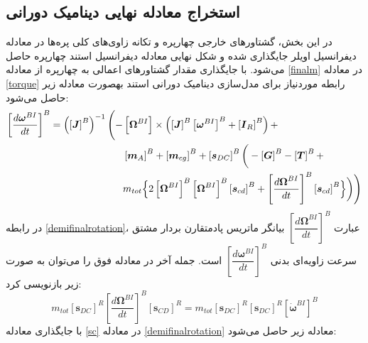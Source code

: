 \subsection{ استخراج معادله نهایی دينامیک دورانی}
در این بخش، گشتاورهای خارجی چهارپره و تكانه زاوی‌های کلی پره‌ها در معادله دیفرانسیل اویلر 
جایگذاری شده و شكل نهایی معادله دیفرانسیل استند چهارپره حاصل می‌شود. با جایگذاری مقدار 
گشتاورهای اعمالی به چهارپره از معادله
\ref{finalm}
در معادله 
\ref{torque}
رابطه موردنیاز برای مدل‌سازی
دینامیک دورانی استند بهصورت معادله زیر حاصل می‌شود:
\begin{equation}\label{demifinalrotation}
	\begin{split}
		\left[\dfrac{d\boldsymbol\omega^{BI}}{dt}\right]^B = 
		\left(\left[\boldsymbol J\right]^B\right)^{-1}\Bigg(
		-&\left[\boldsymbol\Omega^{BI}\right]\times\left(
		\left[\boldsymbol J\right]^B\left[\boldsymbol\omega^{BI}\right]^B
		+\left[\boldsymbol I_R\right]^B\right) + \\
		&\left[\boldsymbol m_A\right]^B + \left[\boldsymbol m_{cg}\right]^B +\left[\boldsymbol s_{DC}\right]^B
		\bigg(-\left[\boldsymbol G\right]^B
		-\left[\boldsymbol T\right]^B+ \\
		&m_{tot}\Bigl\{2
		\left[\boldsymbol \Omega^{BI}\right]^B
		\left[\boldsymbol \Omega^{BI}\right]^B
		\left[\boldsymbol s_{cd}\right]^B+
		\left[\dfrac{d\boldsymbol\Omega^{BI}}{dt}\right]^B
		\left[\boldsymbol s_{cd}\right]^B
		\Bigr\}\bigg)\Bigg)
	\end{split}
\end{equation}
در رابطه
\ref{demifinalrotation}،
عبارت
$\left[\dfrac{d\boldsymbol\Omega^{BI}}{dt}\right]^B$
بیانگر ماتریس پادمتقارن بردار مشتق سرعت‌ زاویه‌ای بدنی
$\left[\dfrac{d\boldsymbol\omega^{BI}}{dt}\right]^B$
است. جمله آخر در معادله فوق را می‌توان به صورت زیر بازنویسی کرد:
\begin{equation}\label{sc}
	m_{tot}\left[\boldsymbol s_{DC}\right]^R
	\left[\dfrac{d\boldsymbol\Omega^{BI}}{dt}\right]^B\left[\boldsymbol s_{CD}\right]^R = 
	m_{tot}\left[\boldsymbol s_{DC}\right]^R\left[\boldsymbol s_{DC}\right]^R
	\left[\dot{\boldsymbol\omega}^{BI}\right]^B
\end{equation}
با جایگذاری معادله
\ref{sc}
در معادله
\ref{demifinalrotation}
معادله زیر حاصل می‌شود:

